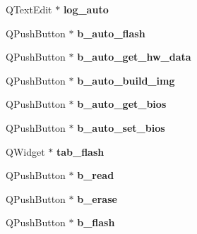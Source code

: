 \begin{DoxyCompactItemize}
\item 
\hypertarget{classUi__MainWindow_ad4a3ea0c03415c5f9b38bbe4e9cf8f61}{Q\-Text\-Edit $\ast$ {\bfseries log\-\_\-auto}}\label{classUi__MainWindow_ad4a3ea0c03415c5f9b38bbe4e9cf8f61}

\item 
\hypertarget{classUi__MainWindow_acd8db516196c88222683824da3dc9919}{Q\-Push\-Button $\ast$ {\bfseries b\-\_\-auto\-\_\-flash}}\label{classUi__MainWindow_acd8db516196c88222683824da3dc9919}

\item 
\hypertarget{classUi__MainWindow_ab4c28a77764fac053804b3b2efb3c3af}{Q\-Push\-Button $\ast$ {\bfseries b\-\_\-auto\-\_\-get\-\_\-hw\-\_\-data}}\label{classUi__MainWindow_ab4c28a77764fac053804b3b2efb3c3af}

\item 
\hypertarget{classUi__MainWindow_acb63584eb149725252772bc7be693ab0}{Q\-Push\-Button $\ast$ {\bfseries b\-\_\-auto\-\_\-build\-\_\-img}}\label{classUi__MainWindow_acb63584eb149725252772bc7be693ab0}

\item 
\hypertarget{classUi__MainWindow_a8722b474130b0ca7d039d201365c5015}{Q\-Push\-Button $\ast$ {\bfseries b\-\_\-auto\-\_\-get\-\_\-bios}}\label{classUi__MainWindow_a8722b474130b0ca7d039d201365c5015}

\item 
\hypertarget{classUi__MainWindow_a69258f781d1d148c486cf4e0287700cf}{Q\-Push\-Button $\ast$ {\bfseries b\-\_\-auto\-\_\-set\-\_\-bios}}\label{classUi__MainWindow_a69258f781d1d148c486cf4e0287700cf}

\item 
\hypertarget{classUi__MainWindow_a07e6f7d1c8cc34539aa60b138b2a82f3}{Q\-Widget $\ast$ {\bfseries tab\-\_\-flash}}\label{classUi__MainWindow_a07e6f7d1c8cc34539aa60b138b2a82f3}

\item 
\hypertarget{classUi__MainWindow_ae89606905cfa404ce84a511345e20599}{Q\-Push\-Button $\ast$ {\bfseries b\-\_\-read}}\label{classUi__MainWindow_ae89606905cfa404ce84a511345e20599}

\item 
\hypertarget{classUi__MainWindow_a5825182d63b281d5acc32c6efacff6ae}{Q\-Push\-Button $\ast$ {\bfseries b\-\_\-erase}}\label{classUi__MainWindow_a5825182d63b281d5acc32c6efacff6ae}

\item 
\hypertarget{classUi__MainWindow_abb4e3ee3b5b7c9ce312276582e9b30fd}{Q\-Push\-Button $\ast$ {\bfseries b\-\_\-flash}}\label{classUi__MainWindow_abb4e3ee3b5b7c9ce312276582e9b30fd}


\end{DoxyCompactItemize}

